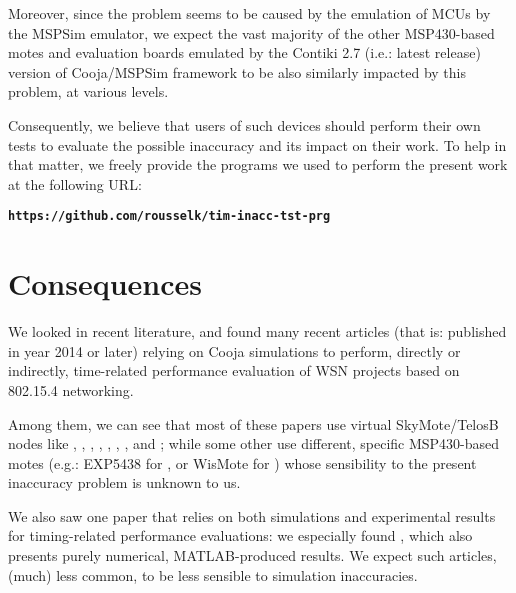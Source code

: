 \documentclass[10pt]{ewsn-proc}
\begin{document}
\medskip

Moreover, since the problem seems to be caused by the emulation of
MCUs by the MSPSim emulator, we expect the vast majority of the other
MSP430-based motes and evaluation boards emulated by the Contiki 2.7
(i.e.: latest release) version of Cooja/MSPSim framework to be also similarly
impacted by this problem, at various levels.

Consequently, we believe that users of such devices should perform their
own tests to evaluate the possible inaccuracy and its impact on their work.
To help in that matter, we freely provide the programs we used to perform the
present work at the following URL:

\smallskip

\begin{center}
\texttt{\textbf{\small https://github.com/rousselk/tim-inacc-tst-prg}}
\end{center}

\bigskip



\section{Consequences}
\label{consequences}

We looked in recent literature, and found many recent articles (that is:
published in year 2014 or later) relying on Cooja simulations to perform,
directly or indirectly, time-related performance evaluation of WSN projects
based on 802.15.4 networking.

Among them, we can see that most of these papers use virtual SkyMote/TelosB
nodes like
\cite{Constrain-Routing-Trees-2014},
\cite{Co-RPL-2014}, \cite{DINAS-2014},
\cite{Efficient-Distrib-Svc-Discovery-2014},
\cite{IETF-Routing-WSN-2014},
\cite{TinySDN-2014}, \cite{Trickle-L2-2014},
and \cite{Visual-Sensor-Networks-2014};
while some other use different, specific MSP430-based motes
(e.g.: EXP5438 for \cite{Key-Mgmt-2015}, or WisMote for
\cite{Lightweight-Multicast-Forwarding-2014}) whose sensibility
to the present inaccuracy problem is unknown to us.

\smallskip

We also saw one paper that relies on both simulations and experimental
results for timing-related performance evaluations: we especially found
\cite{Probing-Mech-wu-2015}, which also presents purely numerical,
MATLAB-produced results. We expect such articles, (much) less common,
to be less sensible to simulation inaccuracies.
\end{document}
